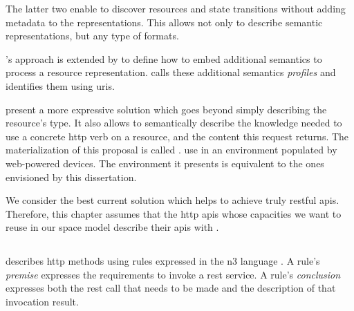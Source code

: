 The latter two enable to discover resources and state transitions without adding metadata to the representations.
This allows not only to describe semantic representations, but any type of formats.


\citeauthor{mark_web_2010}'s \citep{mark_web_2010} approach is extended by \citet{erik_profile_2013} to define how to embed additional semantics to process a resource representation.
\citet{erik_profile_2013} calls these additional semantics \emph{profiles} and identifies them using \acsp{uri}.


\citet{verborgh_ijcs_2014} present a more expressive solution which goes beyond simply describing the resource's type.
It also allows to semantically describe the knowledge needed to use a concrete \acs{http} verb on a resource, and the content this request returns. %
The materialization of this proposal is called \restdesc{} \citep{verborgh_functional_2012}.
\citet{mayer_semantic_2013} use \restdesc{} in an environment populated by web-powered devices. %
The environment it presents is equivalent to the ones envisioned by this dissertation.


\bigskip


We consider \restdesc{} the best current solution which helps to achieve truly \ac{rest}ful \acsp{api}.
Therefore, this chapter assumes that the \ac{http} \acsp{api} whose capacities we want to reuse in our space model describe their \acsp{api} with \restdesc{}.


\subsection{\restdesc{}}
\label{sec:restdesc}

\restdesc{} describes \acs{http} methods using rules expressed in the \ac{n3} language .
A rule's \emph{premise} expresses the requirements to invoke a \ac{rest} service.
A rule's \emph{conclusion} expresses both the \ac{rest} call that needs to be made and the description of that invocation result.


